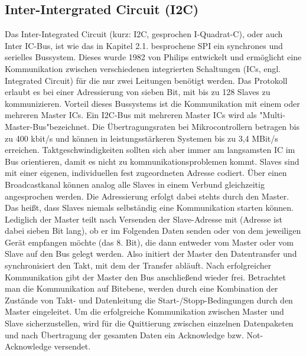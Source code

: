 \subsection{Inter-Intergrated Circuit (I2C)} \label{grund-i2c-subsubsec}


Das Inter-Integrated Circuit (kurz: I2C, gesprochen I-Quadrat-C), oder auch Inter IC-Bus, ist wie das in Kapitel 2.1. besprochene SPI ein synchrones und serielles Bussystem. Dieses wurde 1982  von Philips entwickelt und ermöglicht eine Kommunikation zwischen verschiedenen integrierten Schaltungen (ICs, engl. Integrated Circuit) für die nur zwei Leitungen benötigt werden. Das Protokoll erlaubt es bei einer Adressierung von sieben Bit, mit bis zu 128 Slaves zu kommunizieren. Vorteil dieses Bussystems ist die Kommunikation mit einem oder mehreren Master ICs. Ein I2C-Bus mit mehreren Master ICs wird als "Multi-Master-Bus"bezeichnet. Die Übertragungsraten bei Mikrocontrollern betragen bis zu 400 kbit/s und können in leistungsstärkeren Systemen bis zu 3,4 MBit/s erreichen. Taktgeschwindigkeiten sollten sich aber immer am langsamsten IC im Bus orientieren, damit es nicht zu kommunikationsproblemen kommt. Slaves sind mit einer eigenen, individuellen fest zugeordneten Adresse codiert. Über einen Broadcastkanal können analog alle Slaves in einem Verbund gleichzeitig angesprochen werden. Die Adressierung erfolgt dabei stehts durch den Master. Das heißt, dass Slaves niemals selbständig eine Kommunikation starten können. Lediglich der Master teilt nach Versenden der Slave-Adresse mit (Adresse ist dabei sieben Bit lang), ob er im Folgenden Daten senden oder von dem jeweiligen Gerät empfangen möchte (das 8. Bit), die dann entweder vom Master oder vom Slave auf den Bus gelegt werden. Also initiert der Master den Datentransfer und synchronisiert den Takt, mit dem der Transfer abläuft. Nach erfolgreicher Kommunikation gibt der Master den Bus anschließend wieder frei. Betrachtet man die Kommunikation auf Bitebene, werden durch eine Kombination der Zustände von Takt- und Datenleitung die Start-/Stopp-Bedingungen durch den Master eingeleitet. Um die erfolgreiche Kommunikation zwischen Master und Slave sicherzustellen, wird für die Quittierung zwischen einzelnen Datenpaketen und nach Übertragung der gesamten Daten ein Acknowledge bzw. Not-Acknowledge versendet.

